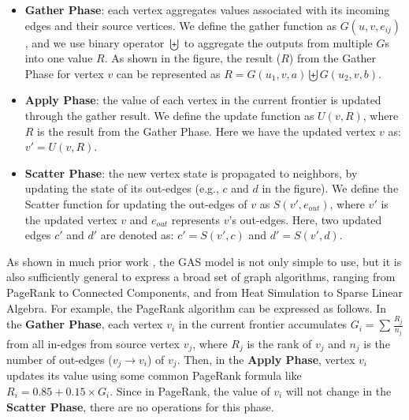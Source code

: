 \vspace{-0.5\baselineskip}
\begin{itemize}
  \item {\bf Gather Phase}: each vertex aggregates values associated with its incoming edges and their source vertices. 
We define the gather function as $G(u, v, e_{ij})$, and we use binary operator $\biguplus$ to aggregate the outputs 
from multiple $G$s into one value $R$. As shown in the figure, the result ($R$) from the Gather Phase for vertex $v$ can be represented 
as $R= G(u_1, v, a)\biguplus G(u_2, v, b)$. 
  \vspace{-0.5\baselineskip}
  \item {\bf Apply Phase}: the value of each vertex in the current frontier is updated through the gather result. 
We define the update function as $U(v, R)$, where $R$ is the result from the Gather Phase. Here 
we have the updated vertex $v$ as: $v' = U(v, R)$.  
  \vspace{-0.5\baselineskip}
  \item {\bf Scatter Phase}: the new vertex state is propagated to neighbors, by updating the state of its out-edges 
(e.g., $c$ and $d$ in the figure). We define the Scatter function for updating the out-edges of $v$ as $S(v', e_{out})$, 
where $v'$ is the updated vertex $v$ and $e_{out}$ represents $v$'s out-edges. Here, two updated edges 
$c'$ and $d'$ are denoted as: $c' = S(v', c)$ and $d' = S(v', d)$.
\vspace{-0.5\baselineskip}
\end{itemize} 


As shown in much prior work \cite{powergraph, pregel}, the GAS model is not only simple to use, but it is also sufficiently general to express
a broad set of graph algorithms, ranging from PageRank to Connected Components, and from Heat Simulation to Sparse Linear Algebra. 
For example, the PageRank algorithm \cite{pagerank} can be expressed as follows. In the {\bf Gather Phase}, each vertex $v_i$ in the current 
frontier accumulates $G_i = \sum_{}^{}{\frac{R_j}{n_j}}$ from all in-edges from source vertex $v_j$, where $R_j$ is the rank of 
$v_j$ and $n_j$ is the number of out-edges ($v_j\rightarrow v_i$) of $v_j$. Then, in the {\bf Apply Phase}, vertex $v_i$ updates 
its value using some common PageRank formula like $R_i = 0.85+0.15\times G_i$. Since in PageRank, the value of $v_i$ will not change 
in the {\bf Scatter Phase}, there are no operations for this phase. 

